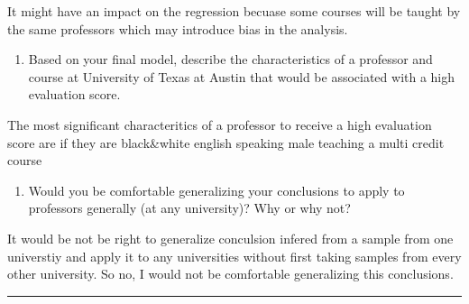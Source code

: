\documentclass[
]{article}
\providecommand{\tightlist}{%
  \setlength{\itemsep}{0pt}\setlength{\parskip}{0pt}}
\begin{document}
It might have an impact on the regression becuase some courses will be
taught by the same professors which may introduce bias in the analysis.

\begin{enumerate}
\def\labelenumi{\arabic{enumi}.}
\setcounter{enumi}{17}
\tightlist
\item
  Based on your final model, describe the characteristics of a professor
  and course at University of Texas at Austin that would be associated
  with a high evaluation score.
\end{enumerate}

The most significant characteritics of a professor to receive a high
evaluation score are if they are black\&white english speaking male
teaching a multi credit course

\begin{enumerate}
\def\labelenumi{\arabic{enumi}.}
\setcounter{enumi}{18}
\tightlist
\item
  Would you be comfortable generalizing your conclusions to apply to
  professors generally (at any university)? Why or why not?
\end{enumerate}

It would be not be right to generalize conculsion infered from a sample
from one universtiy and apply it to any universities without first
taking samples from every other university. So no, I would not be
comfortable generalizing this conclusions.

\begin{center}\rule{0.5\linewidth}{0.5pt}\end{center}
\end{document}
